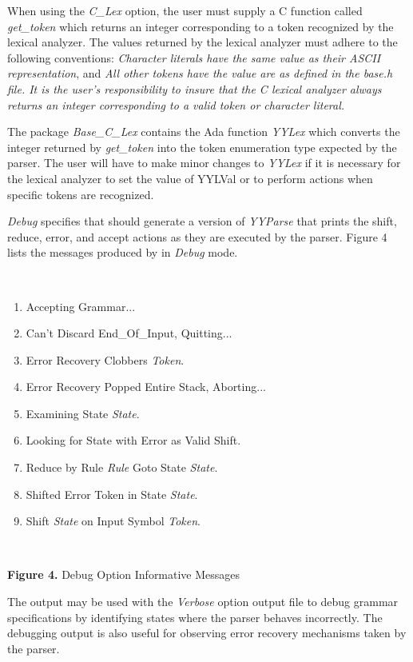 When using the {\it C\_Lex} option, the user must supply a C function called
{ \it get\_token}
which returns an integer corresponding to a token recognized by the
lexical analyzer.  The values returned by the lexical analyzer must
adhere to the following conventions: {\it Character literals have the
same value as their ASCII representation}, and {\it All other tokens
have the value are as defined in the
{\it base.h}
file.  It is the user's responsibility to insure that the C lexical analyzer
always returns an integer corresponding to a valid token or
character literal.}

The package
{\it Base\_C\_Lex}
contains the Ada function
{\it YYLex}
which converts the integer returned by
{\it get\_token}
into the token enumeration type  expected by the parser.  The user will
have to make minor changes to
{\it YYLex}
if it is necessary for the lexical analyzer to set the value of YYLVal or
to perform actions when specific tokens are recognized.

{\it Debug} specifies that \ayacc should generate a version of
{\it YYParse}
that prints the shift, reduce, error, and accept actions as they are
executed by the parser.  Figure 4 lists the messages produced by \ayacc in
{\it Debug} mode.

\hspace{-0.05in}\hrulefill\hspace{0.0in}\\
\vspace{-0.2in}
{\bf
\begin{enumerate}
\item Accepting Grammar...
\item Can't Discard End\_Of\_Input, Quitting...
\item Error Recovery Clobbers {\it Token}.
\item Error Recovery Popped Entire Stack, Aborting...
\item Examining State {\it State}.
\item Looking for State with Error as Valid Shift.
\item Reduce by Rule {\it Rule} Goto State {\it State}.
\item Shifted Error Token in State {\it State}.
\item Shift {\it State} on Input Symbol {\it Token}.
\end{enumerate}
}
\hspace{-0.05in}\hrulefill\hspace{0.0in}\\
\centerline{{\bf Figure 4.} Debug Option Informative Messages}
The output may be used with the {\it Verbose} option
output file to debug grammar specifications by identifying states
where the parser behaves incorrectly.  The debugging output
is also useful for observing error recovery mechanisms taken by the
parser.


